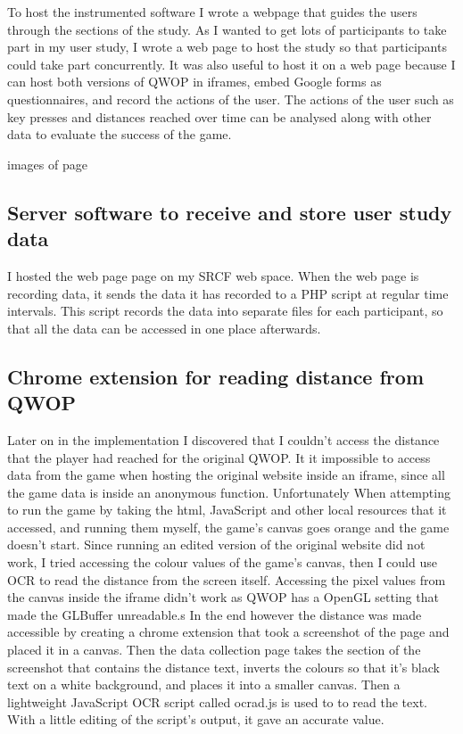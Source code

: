 \documentclass[12pt,a4paper,twoside,openright]{report}
\begin{document}
To host the instrumented software I wrote a webpage that guides the users through the sections of the study. 
As I wanted to get lots of participants to take part in my user study, I wrote a web page to host the study so that participants could take part concurrently. It was also useful to host it on a web page because I can host both versions of QWOP in iframes, embed Google forms as questionnaires, and record the actions of the user. The actions of the user such as key presses and distances reached over time can be analysed along with other data to evaluate the success of the game.

images of page

\subsection{Server software to receive and store user study data}
\label{sec:serverSoftware}


I hosted the web page page on my SRCF web space. When the web page is recording data, it sends the data it has recorded to a PHP script at regular time intervals. This script records the data into separate files for each participant, so that all the data can be accessed in one place afterwards.

\subsection{Chrome extension for reading distance from QWOP}
\label{sec:chromeExtension}


Later on in the implementation I discovered that I couldn't access the distance that the player had reached for the original QWOP. It it impossible to access data from the game when hosting the original website inside an iframe, since all the game data is inside an anonymous function.
Unfortunately When attempting to run the game by taking the html, JavaScript and other local resources that it accessed, and running them myself, the game's canvas goes orange and the game doesn't start.
Since running an edited version of the original website did not work, I tried accessing the colour values of the game's canvas, then I could use OCR to read the distance from the screen itself. Accessing the pixel values from the canvas inside the iframe didn't work as QWOP has a OpenGL setting that made the GLBuffer unreadable.s
In the end however the distance was made accessible by creating a chrome extension that took a screenshot of the page and placed it in a canvas. Then the data collection page takes the section of the screenshot that contains the distance text, inverts the colours so that it's black text on a white background, and places it into a smaller canvas. Then a lightweight JavaScript OCR script called ocrad.js is used to to read the text. With a little editing of the script's output, it gave an accurate value.
\end{document}
